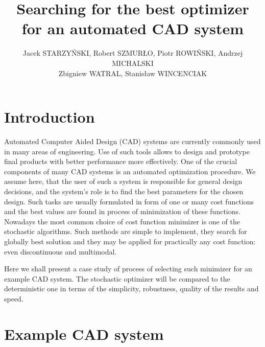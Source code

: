 \documentclass[twocolumn,a4paper]{article}
\title{Searching for the best optimizer for an automated CAD system}
\author{Jacek STARZYŃSKI\aff1, Robert SZMURŁO\aff1, Piotr ROWIŃSKI\aff1, Andrzej MICHALSKI\aff{1,2}\\
Zbigniew WATRAL\aff2, Stanisław WINCENCIAK\aff1}
\affiliation{Warsaw University of Technology (1), Military Academy of Technology (2)}
\begin{document}
\maketitle


\section{Introduction}
Automated Computer Aided Design (CAD) systems are currently commonly used in many areas of engineering. Use of such tools allows to design and prototype final products with better performance more effectively. One of the crucial components of many CAD systems is an automated optimization procedure. We assume here, that the user of such a system is responsible for general design decisions, and the system's role is to find the best parameters for the chosen design.  Such tasks are usually formulated in form of one or many cost functions and the best values are found in process of minimization of these functions.
 Nowadays the most common choice of cost function minimizer
is one of the stochastic algorithms. Such methods are simple to implement, they search for globally best solution and
they may be applied for practically any cost function: even discontinuous and multimodal.

Here we shall present a case study of process of selecting such minimizer for an example CAD system.
The stochastic optimizer will be compared to the deterministic one in terms of the simplicity, robustness, quality of the results and speed.



\section{Example CAD system}
\end{document}
